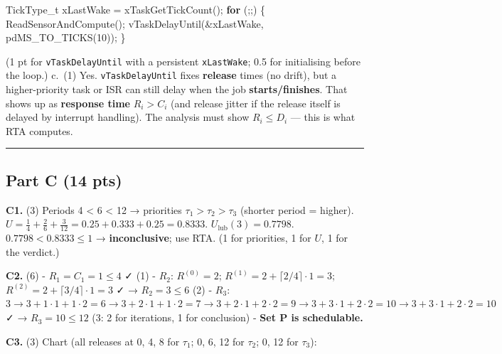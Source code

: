 \documentclass[
  11pt,
]{article}
\newenvironment{Shaded}{}{}
\newcommand{\ControlFlowTok}[1]{\textcolor[rgb]{0.00,0.44,0.13}{\textbf{#1}}}
\newcommand{\DecValTok}[1]{\textcolor[rgb]{0.25,0.63,0.44}{#1}}
\newcommand{\NormalTok}[1]{#1}
\newcommand{\OperatorTok}[1]{\textcolor[rgb]{0.40,0.40,0.40}{#1}}
\begin{document}
\begin{Shaded}
\begin{Highlighting}[]
\NormalTok{TickType\_t xLastWake }\OperatorTok{=}\NormalTok{ xTaskGetTickCount}\OperatorTok{();}
\ControlFlowTok{for} \OperatorTok{(;;)} \OperatorTok{\{}
\NormalTok{    ReadSensorAndCompute}\OperatorTok{();}
\NormalTok{    vTaskDelayUntil}\OperatorTok{(\&}\NormalTok{xLastWake}\OperatorTok{,}\NormalTok{ pdMS\_TO\_TICKS}\OperatorTok{(}\DecValTok{10}\OperatorTok{));}
\OperatorTok{\}}
\end{Highlighting}
\end{Shaded}

(1 pt for \texttt{vTaskDelayUntil} with a persistent \texttt{xLastWake};
0.5 for initialising before the loop.) c.~(1) Yes.
\texttt{vTaskDelayUntil} fixes \textbf{release} times (no drift), but a
higher-priority task or ISR can still delay when the job
\textbf{starts/finishes}. That shows up as \textbf{response time}
\(R_i > C_i\) (and release jitter if the release itself is delayed by
interrupt handling). The analysis must show \(R_i \le D_i\) --- this is
what RTA computes.

\begin{center}\rule{0.5\linewidth}{0.5pt}\end{center}

\subsection{Part C (14 pts)}\label{part-c-14-pts}

\textbf{C1.} (3) Periods 4 \textless{} 6 \textless{} 12 → priorities
\(\tau_1 > \tau_2 > \tau_3\) (shorter period = higher).
\(U = \tfrac14 + \tfrac26 + \tfrac3{12} = 0.25 + 0.333 + 0.25 = 0.8333\).
\(U_{\text{lub}}(3) = 0.7798\). \(0.7798 < 0.8333 \le 1\) →
\textbf{inconclusive}; use RTA. (1 for priorities, 1 for \(U\), 1 for
the verdict.)

\textbf{C2.} (6) - \(R_1 = C_1 = 1 \le 4\) ✓ (1) - \(R_2\):
\(R^{(0)} = 2\); \(R^{(1)} = 2 + \lceil 2/4 \rceil \cdot 1 = 3\);
\(R^{(2)} = 2 + \lceil 3/4 \rceil \cdot 1 = 3\) ✓ → \(R_2 = 3 \le 6\)
(2) - \(R_3\):
\(3 \to 3 + 1\cdot1 + 1\cdot2 = 6 \to 3 + 2\cdot1 + 1\cdot2 = 7 \to 3 + 2\cdot1 + 2\cdot2 = 9 \to 3 + 3\cdot1 + 2\cdot2 = 10 \to 3 + 3\cdot1 + 2\cdot2 = 10\)
✓ → \(R_3 = 10 \le 12\) (3: 2 for iterations, 1 for conclusion) -
\textbf{Set P is schedulable.}

\textbf{C3.} (3) Chart (all releases at 0, 4, 8 for \(\tau_1\); 0, 6, 12
for \(\tau_2\); 0, 12 for \(\tau_3\)):
\end{document}
